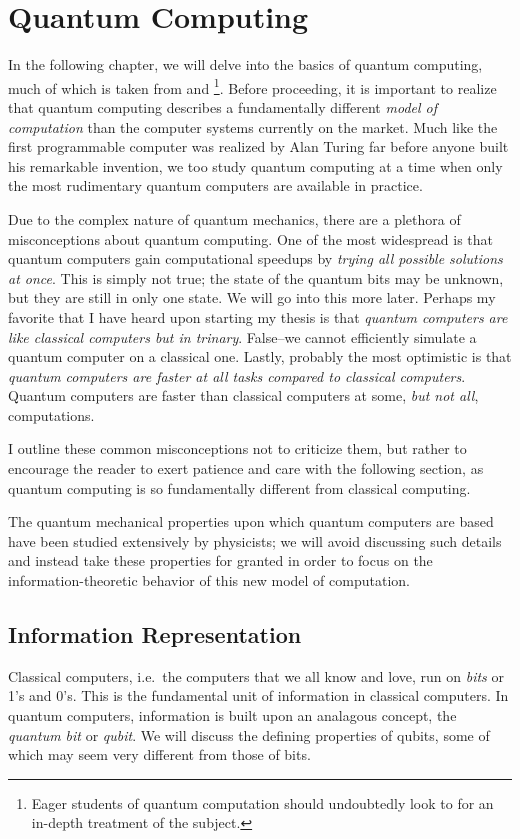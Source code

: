 \documentclass[12pt,twoside]{reedthesis}
\theoremstyle{definition}
\begin{document}
	
\chapter{Quantum Computing}


In the following chapter, we will delve into the basics of quantum computing, much of which is taken from \cite{nielsenchuang} and  \cite{de2001quantum} \footnote{Eager students of quantum computation should undoubtedly look to \cite{nielsenchuang} for an in-depth treatment of the subject.}.  Before proceeding, it is important to realize that quantum computing describes a  fundamentally different \textit{model of computation} than the computer systems currently on the market. Much like the first programmable computer was realized by Alan Turing far before anyone built his remarkable invention, we too study quantum computing at a time when only the most rudimentary quantum computers are available in practice.


Due to the complex nature of quantum mechanics, there are a plethora of misconceptions about quantum computing. One of the most widespread is that quantum computers gain computational speedups by \emph{trying all possible solutions at once}. This is simply not true; the state of the quantum bits may be unknown, but they are still in only one state. We will go into this more later. Perhaps my favorite that I have heard upon starting my thesis is that \emph{quantum computers are like classical computers but in trinary}. False--we cannot efficiently simulate a quantum computer on a classical one. Lastly, probably the most optimistic is that \emph{quantum computers are faster at all tasks compared to classical computers}. Quantum computers are faster than classical computers at some, \emph{but not all}, computations.

I outline these common misconceptions not to criticize them, but rather to encourage the reader to exert patience and care with the following section, as quantum computing is so fundamentally different from classical computing.

The quantum mechanical properties upon which quantum computers are based have been studied extensively by physicists; we will avoid discussing such details and instead take these properties for granted in order to focus on the information-theoretic behavior of this new model of computation. 

\section{Information Representation}
Classical computers, i.e.~the computers that we all know and love, run on \textit{bits} or 1's and 0's. This is the fundamental unit of information in classical computers. In quantum computers, information is built upon an analagous concept, the \textit{quantum bit} or \textit{qubit}. We will discuss the defining properties of qubits, some of which may seem very different from those of bits.
\end{document}
